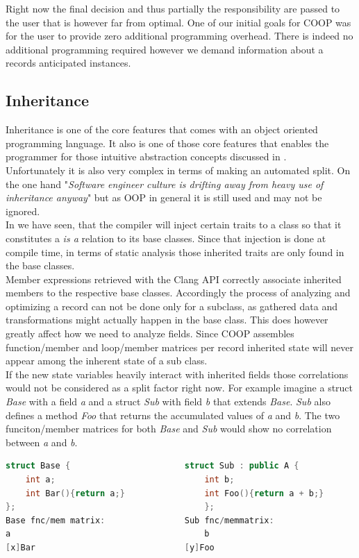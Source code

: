 Right now the final decision and thus partially the responsibility are passed to the user that is however far from optimal. One of our initial goals for COOP was for the user to provide zero additional programming overhead. There is indeed no additional programming required however we demand information about a records anticipated instances.

\subsection{Inheritance}\label{inheritance}
Inheritance is one of the core features that comes with an object oriented programming language. It also is one of those core features that enables the programmer for those intuitive abstraction concepts discussed in .\\
Unfortunately it is also very complex in terms of making an automated split. On the one hand "\textit{Software engineer culture is drifting away from heavy use of inheritance anyway}"  but as OOP in general it is still used and may not be ignored.\\
In  we have seen, that the compiler will inject certain traits to a class so that it constitutes a \textit{is a} relation to its base classes. Since that injection is done at compile time, in terms of static analysis those inherited traits are only found in the base classes.\\
Member expressions retrieved with the Clang API correctly associate inherited members to the respective base classes. Accordingly the process of analyzing and optimizing a record can not be done only for a subclass, as gathered data and transformations might actually happen in the base class. This does however greatly affect how we need to analyze fields. Since COOP assembles function/member and loop/member matrices per record inherited state will never appear among the inherent state of a sub class.\\
If the new state variables heavily interact with inherited fields those correlations would not be considered as a split factor right now. For example imagine a struct \textit{Base} with a field \textit{a} and a struct \textit{Sub} with field \textit{b} that extends \textit{Base}. \textit{Sub} also defines a method \textit{Foo} that returns the accumulated values of \textit{a} and \textit{b}. The two funciton/member matrices for both \textit{Base} and \textit{Sub} would show no correlation between \textit{a} and \textit{b}.
\begin{lstlisting}[language=C++, name={Function/Member matrices for classes related by inheritance.}, label={inheritance_fmm}]
struct Base {						struct Sub : public A {
	int a;								int b;
	int Bar(){return a;}				int Foo(){return a + b;}
};										};
Base fnc/mem matrix:				Sub fnc/memmatrix:
a										b
[x]Bar								[y]Foo
\end{lstlisting}

